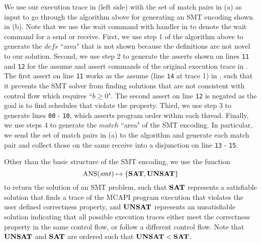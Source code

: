 We use our execution trace in  (left side) with the set of match pairs in (a) as input to go through the algorithm above for generating an SMT encoding shown in (b). Note that we use the wait command with handler in  to denote the wait command for a send or receive. First, we use step 1 of the algorithm above to generate the $\mathit{defs}$ ``area" that is not shown because the definitions are not novel to our solution. Second, we use step 2 to generate the asserts shown on lines \texttt{11} and \texttt{12} for the assume and assert commands of the original execution trace in . The first assert on line \texttt{11} works as the assume (line \texttt{14} at trace 1) in , such that it prevents the SMT solver from finding solutions that are not consistent with control flow which requires ``$b \ge 0$". The second assert on line \texttt{12} is negated as the goal is to find schedules that violate the property. Third, we use step 3 to generate lines \texttt{00} - \texttt{10}, which asserts program order within each thread. Finally, we use steps 4 to generate the $\mathit{match}$ ``area" of the SMT encoding. In particular, we send the set of match pairs in (a) to the algorithm and generate each match pair and collect those on the same receive into a disjunction on line \texttt{13} - \texttt{15}.

Other than the basic structure of the SMT encoding, we use the function
\[\mathrm{ANS}(\mathit{smt}) \mapsto \{\mathrm{\textbf{SAT}},\mathrm{\textbf{UNSAT}}\} \]
to return the solution of an SMT problem, such that $\mathrm{\textbf{SAT}}$ represents a satisfiable solution that finds a trace of the MCAPI program execution that violates the user defined correctness property, and $\mathrm{\textbf{UNSAT}}$ represents an unsatisfiable solution indicating that all possible execution traces either meet the correctness property in the same control flow, or follow a different control flow. Note that $\mathrm{\textbf{UNSAT}}$ and $\mathrm{\textbf{SAT}}$ are ordered such that $\mathrm{\textbf{UNSAT}} < \mathrm{\textbf{SAT}}$.

